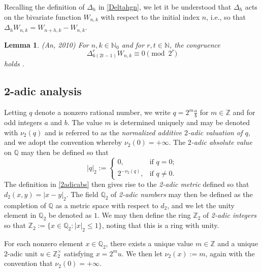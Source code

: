 \documentclass[11pt,letterpaper]{amsart}
\newtheorem{lemma}{Lemma}%
\begin{document}
 Recalling the definition of $\Delta_h$ in \eqref{Deltahgn}, we let it be understood that $ \Delta_h$ acts on the bivariate function $W_{n, 
 k}$ with respect to the initial index $n$, i.e., so that 
 $ \Delta_h W_{n, k} = W_{n + h, k} - W_{n, k}$. 

\begin{lemma}\label{Anlemma}
 (An, 2010) For $n, k \in \mathbb{N}_{0}$ and for $r, t \in \mathbb{N}$, 
 the congruence
\begin{equation}\label{Andisplay}
 \Delta_{6(2t-1)}^r W_{n, k} \equiv 0 \pmod{2^r} 
\end{equation}
 holds \cite[p.\ 20]{An2010}. 
\end{lemma}

\subsection{2-adic analysis}\label{prelim2adic}
 Letting $q$ denote a nonzero rational number, we write $q = 2^{m} \frac{a}{b}$ for $m \in \mathbb{Z}$ and for odd integers $a$ and 
 $b$. The value $m$ is determined uniquely and may be denoted with $\nu_2(q)$ and is referred to as the \emph{normalized additive 
 $2$-adic valuation of $q$}, and we adopt the convention whereby $\nu_2(0) = +\infty$. 
 The \emph{$2$-adic absolute value} on $\mathbb{Q}$ may then be defined so that 
\begin{equation}\label{2adicabs}
 \left| q \right|_{2} := \begin{cases} 
 0, & \text{if $q = 0$;} \\ 
 2^{-\nu_2(q)}, & \text{if $q \neq 0$.} 
 \end{cases} 
\end{equation}
 The definition in \eqref{2adicabs} then gives rise to the \emph{2-adic metric}
 defined so that $d_{2}(x, y) = |x - y|_{2}$. 
 The field $\mathbb{Q}_{2}$ of \emph{2-adic numbers} may then be defined as the completion of 
 $\mathbb{Q}$ as a metric space with respect to $d_2$, 
 and we let the unity element in $\mathbb{Q}_{2}$ be denoted as $1$. 
 We may then define the ring $\mathbb{Z}_{2}$ of \emph{2-adic integers}
 so that $\mathbb{Z}_{2} := \{ x \in \mathbb{Q}_{2} : |x|_{2} \leq 1 \}$, noting that this is a ring with unity. 

 For each nonzero element $x \in \mathbb{Q}_{2}$, there exists a unique value $m \in \mathbb{Z}$ and a unique $2$-adic unit $u \in 
 \mathbb{Z}_{2}^{\times}$ satisfying $x = 2^{m} u$. We then let $\nu_2(x) := m$, 
 again with the convention that $\nu_2(0) = +\infty$. 
\end{document}
